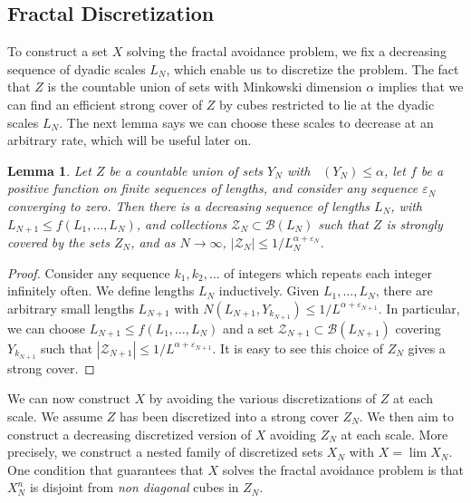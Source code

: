 \documentclass{article}
\theoremstyle{plain}
\newtheorem{lemma}{Lemma}
\theoremstyle{plain}
\DeclareMathOperator{\lhdim}{\underline{\dim}_{\mathbf{M}}}
\begin{document}
\begin{multicols}{2}
\section{Fractal Discretization}

To construct a set $X$ solving the fractal avoidance problem, we fix a decreasing sequence of dyadic scales $L_N$, which enable us to discretize the problem. The fact that $Z$ is the countable union of sets with Minkowski dimension $\alpha$ implies that we can find an efficient strong cover of $Z$ by cubes restricted to lie at the dyadic scales $L_N$. The next lemma says we can choose these scales to decrease at an arbitrary rate, which will be useful later on.

\begin{lemma}
	Let $Z$ be a countable union of sets $Y_N$ with $\lhdim(Y_N) \leq \alpha$, let $f$ be a positive function on finite sequences of lengths, and consider any sequence $\varepsilon_N$ converging to zero. Then there is a decreasing sequence of lengths $L_N$, with $L_{N+1} \leq f(L_1, \dots, L_N)$, and collections $\mathcal{Z}_N \subset \mathcal{B}(L_N)$ such that $Z$ is strongly covered by the sets $Z_N$, and as $N \to \infty$, $|\mathcal{Z}_N| \leq 1/L_N^{\alpha + \varepsilon_N}$.
\end{lemma}
\begin{proof}
	Consider any sequence $k_1, k_2, \dots$ of integers which repeats each integer infinitely often. We define lengths $L_N$ inductively. Given $L_1, \dots, L_N$, there are arbitrary small lengths $L_{N+1}$ with $N(L_{N+1},Y_{k_{N+1}}) \leq 1/L^{\alpha + \varepsilon_{N+1}}$. In particular, we can choose $L_{N+1} \leq f(L_1, \dots, L_N)$ and a set $\mathcal{Z}_{N+1} \subset \mathcal{B}(L_{N+1})$ covering $Y_{k_{N+1}}$ such that $|\mathcal{Z}_{N+1}| \leq 1/L^{\alpha + \varepsilon_{N+1}}$. It is easy to see this choice of $Z_N$ gives a strong cover.
\end{proof}

We can now construct $X$ by avoiding the various discretizations of $Z$ at each scale. We assume $Z$ has been discretized into a strong cover $Z_N$. We then aim to construct a decreasing discretized version of $X$ avoiding $Z_N$ at each scale. More precisely, we construct a nested family of discretized sets $X_N$ with $X = \lim X_N$. One condition that guarantees that $X$ solves the fractal avoidance problem is that $X_N^n$ is disjoint from {\it non diagonal} cubes in $Z_N$.


\end{multicols}
\end{document}
